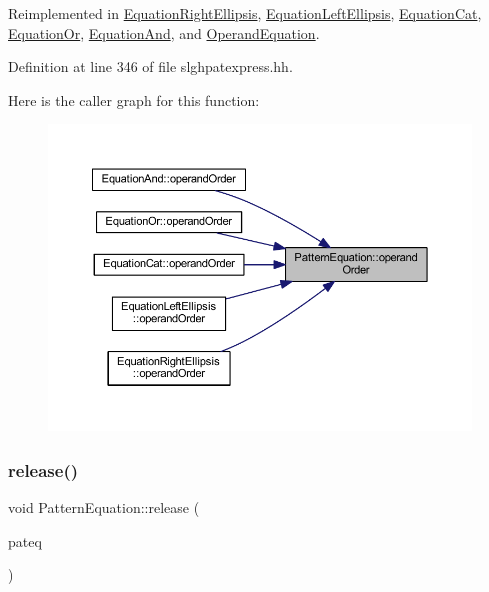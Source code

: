 Reimplemented in \mbox{\hyperlink{class_equation_right_ellipsis_a43707cb523898b0a1b7d7cc1c7dbb779}{Equation\+Right\+Ellipsis}}, \mbox{\hyperlink{class_equation_left_ellipsis_a661203e5beadef3033ac3112353e012b}{Equation\+Left\+Ellipsis}}, \mbox{\hyperlink{class_equation_cat_a3504199664351bffd3aeb8b6e8246fec}{Equation\+Cat}}, \mbox{\hyperlink{class_equation_or_a03a072384883e49f46825d1227872189}{Equation\+Or}}, \mbox{\hyperlink{class_equation_and_a6afd29fe0c292441a2fb1edf671ba5ef}{Equation\+And}}, and \mbox{\hyperlink{class_operand_equation_ae6c672be7a442660c2923112b7dd3a4d}{Operand\+Equation}}.



Definition at line 346 of file slghpatexpress.\+hh.

Here is the caller graph for this function\+:
\nopagebreak
\begin{figure}[H]
\begin{center}
\leavevmode
\includegraphics[width=350pt]{class_pattern_equation_a944d7114e5d5b6876352e555cc060829_icgraph}
\end{center}
\end{figure}
\mbox{\label{class_pattern_equation_ab810cb4b0638eb2d9413a3d17af56c11}} 
\subsubsection{\texorpdfstring{release()}{release()}}
{\footnotesize\ttfamily void Pattern\+Equation\+::release (\begin{DoxyParamCaption}\item[{\mbox{\hyperlink{class_pattern_equation}{Pattern\+Equation}} $\ast$}]{pateq }\end{DoxyParamCaption})\hspace{0.3cm}{\ttfamily [static]}}



